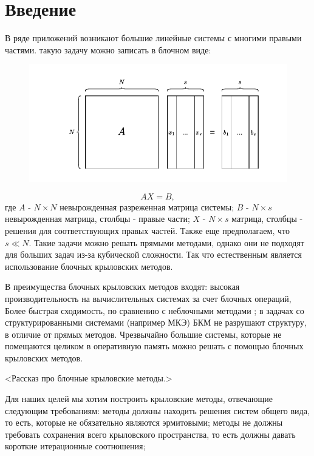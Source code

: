\section{Введение}
\label{sec:Chapter0} 
В ряде приложений возникают большие линейные системы с многими правыми частями. такую задачу можно записать в блочном виде:\\
\begin{figure}[H]
    \centering
    \includegraphics[width=0.5\linewidth]{images/system.pdf}
    \label{fig:system}
\end{figure}
$$AX=B,$$
где $A$ - $N\times N$ невырожденная разреженная матрица системы;
$B$ - $N\times s$ невырожденная матрица, столбцы - правые части; 
$X$ - $N\times s$ матрица, столбцы - решения для соответствующих правых частей. 
Также еще предполагаем, что $s\ll N$.
Такие задачи можно решать прямыми методами, однако они не подходят для больших 
задач из-за кубической сложности. Так что естественным является использование 
блочных крыловских методов.\\

\par В преимущества блочных крыловских методов входят:
высокая производительность на вычислительных системах за счет блочных операций,
Более быстрая сходимость, по сравнению с неблочными методами \cite{OLEARY1980293}; 
в задачах со структурированными системами (например МКЭ) БКМ не разрушают структуру,
в отличие от прямых методов.
Чрезвычайно большие системы, которые не помещаются целиком в оперативную память 
можно решать с помощью блочных крыловских методов.\\
\par <Рассказ про блочные крыловские методы.>\\
\par Для наших целей мы хотим построить крыловские методы, отвечающие следующим требованиям: методы должны находить
решения систем общего вида, то есть, которые не обязательно являются эрмитовыми;
методы не должны требовать сохранения всего крыловского пространства, то есть должны 
давать короткие итерационные соотношения; 


\newpage

